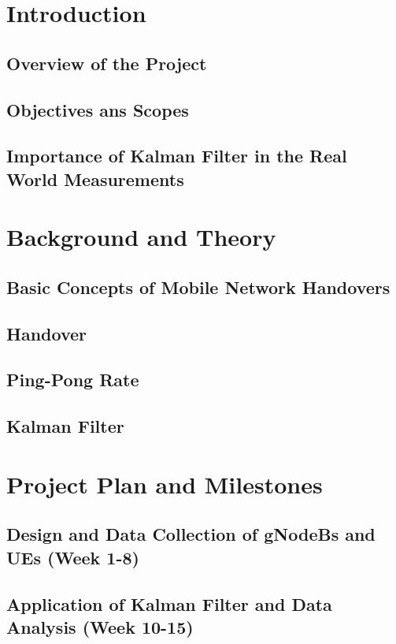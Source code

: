 \documentclass[a4paper, 11pt]{article}
\begin{document}
\setlength{\parindent}{1em} 




\tableofcontents

\section{Introduction}
\subsection{Overview of the Project}
\subsection{Objectives ans Scopes}
\subsection{Importance of Kalman Filter in the Real World Measurements}
\section{Background and Theory}
\subsection{Basic Concepts of Mobile Network Handovers}
\subsection{Handover}
\subsection{Ping-Pong Rate}
\subsection{Kalman Filter}

\section{Project Plan and Milestones}
\subsection{Design and Data Collection of gNodeBs and UEs (Week 1-8)}
\subsection{Application of Kalman Filter and Data Analysis (Week 10-15)}
\end{document}
